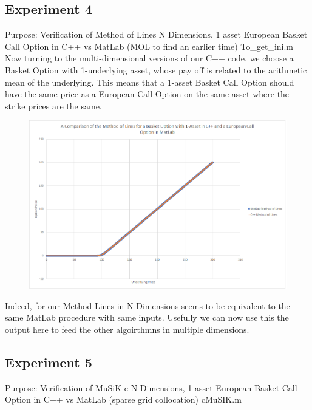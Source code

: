 \documentclass[a4paper]{amsart}
\begin{document}
\subsection{Experiment 4}\label{cppExp4}

Purpose: Verification of Method of Lines N Dimensions, 1 asset European Basket Call Option in C++ vs MatLab (MOL to find an earlier time) To\_get\_ini.m\\

Now turning to the multi-dimensional versions of our C++ code, we choose a Basket Option with 1-underlying asset, whose pay off is related to the arithmetic mean of the underlying. This means that a 1-asset Basket Call Option should have the same price as a European Call Option on the same asset where the strike prices are the same.

\begin{figure}[h]
\centering
\includegraphics[scale=0.3]{cppExp4-chart.png}
\caption {}
\label {fig:cppExp4}
\end{figure}

Indeed, for our Method Lines in N-Dimensions seems to be equivalent to the same MatLab procedure with same inputs. Usefully we can now use this the output here to feed the other algoirthmns in multiple dimensions.

\subsection{Experiment 5}\label{cppExp5}

Purpose: Verification of MuSiK-c N Dimensions, 1 asset European Basket Call Option in C++ vs MatLab (sparse grid collocation) cMuSIK.m\\
\end{document}
